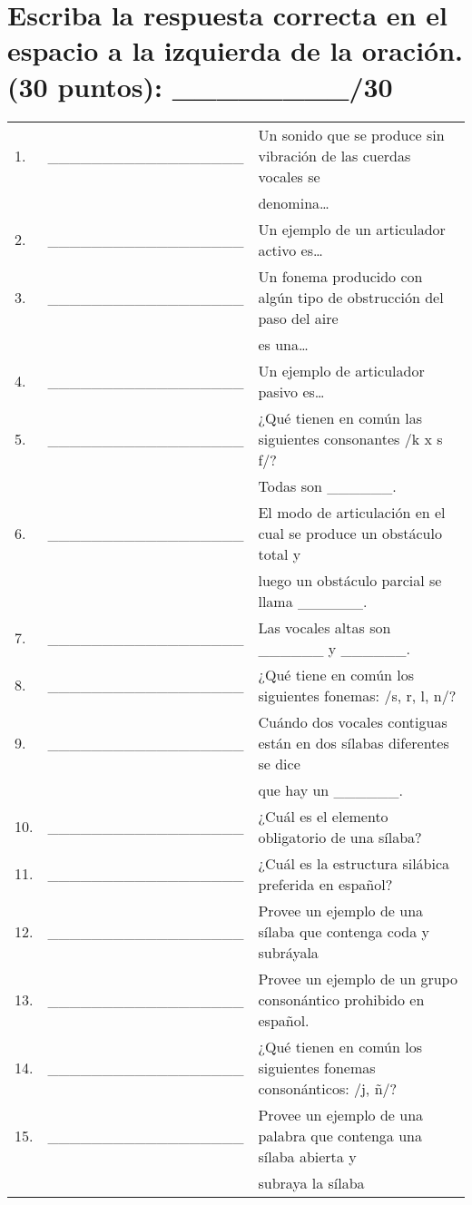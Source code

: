 \documentclass[12pt]{exam}
\begin{document}
\section{Escriba la respuesta correcta en el espacio a la izquierda de la oración. (30 puntos): \_\_\_\_\_\_\_\_/30}

\renewcommand{\arraystretch}{1.75}
	\begin{tabular}{@{}llp{2cm}@{}}
	 1.  & \_\_\_\_\_\_\_\_\_\_\_\_\_\_\_\_\_\_ & Un sonido que se produce sin vibración de las cuerdas vocales se \\&& denomina\ldots        \\
	 2.  & \_\_\_\_\_\_\_\_\_\_\_\_\_\_\_\_\_\_ & Un ejemplo de un articulador activo es\ldots                                          \\
	 3.  & \_\_\_\_\_\_\_\_\_\_\_\_\_\_\_\_\_\_ & Un fonema producido con algún tipo de obstrucción del paso del aire \\&& es una\ldots       \\
	 4.  & \_\_\_\_\_\_\_\_\_\_\_\_\_\_\_\_\_\_ & Un ejemplo de articulador pasivo es\ldots \\
	 5.  & \_\_\_\_\_\_\_\_\_\_\_\_\_\_\_\_\_\_ & ¿Qué tienen en común las siguientes consonantes /k x s f/? \\&& Todas son \_\_\_\_\_\_.\\
	 6.  & \_\_\_\_\_\_\_\_\_\_\_\_\_\_\_\_\_\_ & El modo de articulación en el cual se produce un obstáculo total y \\&& luego un obstáculo parcial se llama \_\_\_\_\_\_.\\
	 7. & \_\_\_\_\_\_\_\_\_\_\_\_\_\_\_\_\_\_ & Las vocales altas son \_\_\_\_\_\_ y \_\_\_\_\_\_.\\
	 8. & \_\_\_\_\_\_\_\_\_\_\_\_\_\_\_\_\_\_ & ¿Qué tiene en común los siguientes fonemas: /s, r, l, n/?\\
	 9. & \_\_\_\_\_\_\_\_\_\_\_\_\_\_\_\_\_\_ & Cuándo dos vocales contiguas están en dos sílabas diferentes se dice \\&& que hay un \_\_\_\_\_\_.\\
	 10. & \_\_\_\_\_\_\_\_\_\_\_\_\_\_\_\_\_\_ & ¿Cuál es el elemento obligatorio de una sílaba?\\
	 11. & \_\_\_\_\_\_\_\_\_\_\_\_\_\_\_\_\_\_ & ¿Cuál es la estructura silábica preferida en español?\\
	 12. & \_\_\_\_\_\_\_\_\_\_\_\_\_\_\_\_\_\_ & Provee un ejemplo de una sílaba que contenga coda y subráyala \\
	 13. & \_\_\_\_\_\_\_\_\_\_\_\_\_\_\_\_\_\_ & Provee un ejemplo de un grupo consonántico prohibido en español. \\
	 14. & \_\_\_\_\_\_\_\_\_\_\_\_\_\_\_\_\_\_ & ¿Qué tienen en común los siguientes fonemas consonánticos: /j, ñ/? \\
	 15. & \_\_\_\_\_\_\_\_\_\_\_\_\_\_\_\_\_\_ & Provee un ejemplo de una palabra que contenga una sílaba abierta y \\&& subraya la sílaba\\
	\end{tabular}
\end{document}
